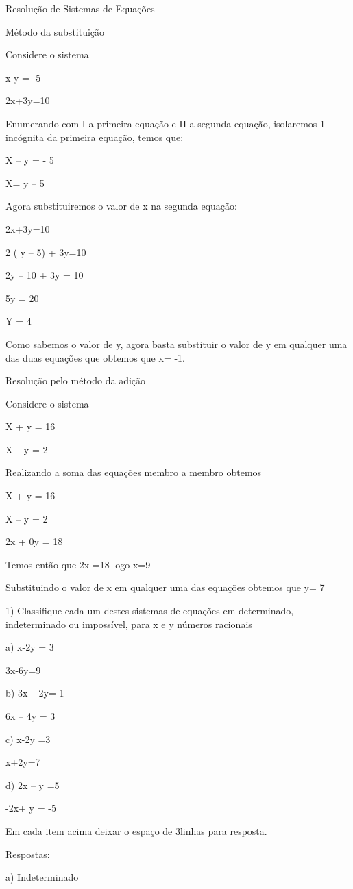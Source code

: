 {Resolução de Sistemas de Equações

Método da substituição

Considere o sistema

x-y = -5

2x+3y=10

Enumerando com I a primeira equação e II a segunda equação, isolaremos 1
incógnita da primeira equação, temos que:

X -- y = - 5

X= y -- 5

Agora substituiremos o valor de x na segunda equação:

2x+3y=10

2 ( y -- 5) + 3y=10

2y -- 10 + 3y = 10

5y = 20

Y = 4

Como sabemos o valor de y, agora basta substituir o valor de y em
qualquer uma das duas equações que obtemos que x= -1.

Resolução pelo método da adição

Considere o sistema

X + y = 16

X -- y = 2

Realizando a soma das equações membro a membro obtemos

X + y = 16

X -- y = 2

2x + 0y = 18

Temos então que 2x =18 logo x=9

Substituindo o valor de x em qualquer uma das equações obtemos que y= 7


1) Classifique cada um destes sistemas de equações em determinado,
indeterminado ou impossível, para x e y números racionais

a) x-2y = 3

3x-6y=9

b) 3x -- 2y= 1

6x -- 4y = 3

c) x-2y =3

x+2y=7

d) 2x -- y =5

-2x+ y = -5

Em cada item acima deixar o espaço de 3linhas para resposta.

Respostas:

a) Indeterminado

}
